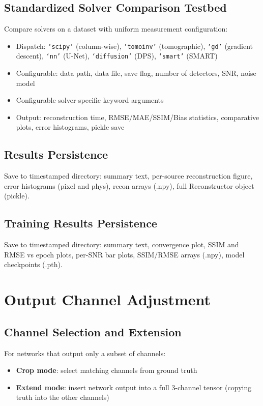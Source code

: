 \documentclass[11pt,a4paper]{article}
\begin{document}
\subsection{Standardized Solver Comparison Testbed}
Compare solvers on a dataset with uniform measurement configuration:
\begin{itemize}[nosep]
  \item Dispatch: \texttt{`scipy'} (column-wise), \texttt{`tomoinv'} (tomographic), \texttt{`gd'} (gradient descent), \texttt{`nn'} (U-Net), \texttt{`diffusion'} (DPS), \texttt{`smart'} (SMART)
  \item Configurable: data path, data file, save flag, number of detectors, SNR, noise model
  \item Configurable solver-specific keyword arguments
  \item Output: reconstruction time, RMSE/MAE/SSIM/Bias statistics, comparative plots, error histograms, pickle save
\end{itemize}

\subsection{Results Persistence}
Save to timestamped directory: summary text, per-source reconstruction figure, error histograms (pixel and phys), recon arrays (.npy), full Reconstructor object (pickle).

\subsection{Training Results Persistence}
Save to timestamped directory: summary text, convergence plot, SSIM and RMSE vs epoch plots, per-SNR bar plots, SSIM/RMSE arrays (.npy), model checkpoints (.pth).

\section{Output Channel Adjustment}

\subsection{Channel Selection and Extension}
For networks that output only a subset of channels:
\begin{itemize}[nosep]
  \item \textbf{Crop mode}: select matching channels from ground truth
  \item \textbf{Extend mode}: insert network output into a full 3-channel tensor (copying truth into the other channels)
\end{itemize}
\end{document}
